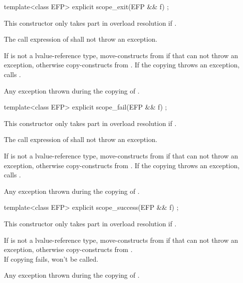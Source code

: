 \documentclass[ebook,11pt,article]{memoir}
\begin{document}
\begin{itemdecl}
template<class EFP>
explicit
scope_exit(EFP && f) ;
\end{itemdecl}

\begin{itemdescr}
\pnum
\remark This constructor only takes part in overload resolution if .

\pnum
\requires The call expression of  shall not throw an exception.

\pnum
\effects If  is not a lvalue-reference type, move-constructs   from   if that can not throw an exception, otherwise copy-constructs  from . If the copying throws an exception, calls .

\pnum
\throws Any exception thrown during the copying of .

\end{itemdescr}


\begin{itemdecl}
template<class EFP>
explicit
scope_fail(EFP && f) ;
\end{itemdecl}

\begin{itemdescr}
\pnum
\remark This constructor only takes part in overload resolution if .

\pnum
\requires The call expression of  shall not throw an exception.

\pnum
\effects If  is not a lvalue-reference type, move-constructs   from  if that can not throw an exception, otherwise copy-constructs  from . If the copying throws an exception, calls .

\pnum
\throws Any exception thrown during the copying of .

\end{itemdescr}

\begin{itemdecl}
template<class EFP>
explicit
scope_success(EFP && f) ;
\end{itemdecl}

\begin{itemdescr}
\remark This constructor only takes part in overload resolution if .

\pnum
\effects \effects If  is not a lvalue-reference type, move-constructs   from  if that can not throw an exception, otherwise copy-constructs  from .\\
\enternote
If copying fails,  won't be called.
\exitnote

\pnum
\throws Any exception thrown during the copying of .
\end{itemdescr}
\end{document}

